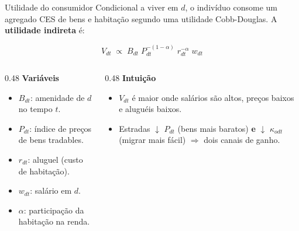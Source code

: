 \begin{frame}{Utilidade do consumidor}
    Condicional a viver em $d$, o indivíduo consome um agregado CES de bens e habitação
    segundo uma utilidade Cobb-Douglas. A \textbf{utilidade indireta} é:

    \begin{equation}\label{eq:utility}
        V_{dt} \;\propto\; B_{dt}\; P_{dt}^{-(1-\alpha)}\; r_{dt}^{-\alpha}\; w_{dt}
    \end{equation}

    \vspace{0.1cm}

    \begin{columns}[T]
        \begin{column}{0.48\textwidth}
            \textbf{Variáveis}
            \begin{itemize}\small
                \item $B_{dt}$: amenidade de $d$ no tempo $t$.
                \item $P_{dt}$: índice de preços de bens tradables.
                \item $r_{dt}$: aluguel (custo de habitação).
                \item $w_{dt}$: salário em $d$.
                \item $\alpha$: participação da habitação na renda.
            \end{itemize}
        \end{column}
        \begin{column}{0.48\textwidth}
            \textbf{Intuição}
            \begin{itemize}\small
                \item $V_{dt}$ é maior onde salários são altos, preços baixos e aluguéis baixos.
                \item Estradas $\downarrow$ $P_{dt}$ (bens mais baratos) \textbf{e} $\downarrow$ $\kappa_{odt}$ (migrar mais fácil) $\Rightarrow$ dois canais de ganho.
            \end{itemize}
        \end{column}
    \end{columns}
\end{frame}

